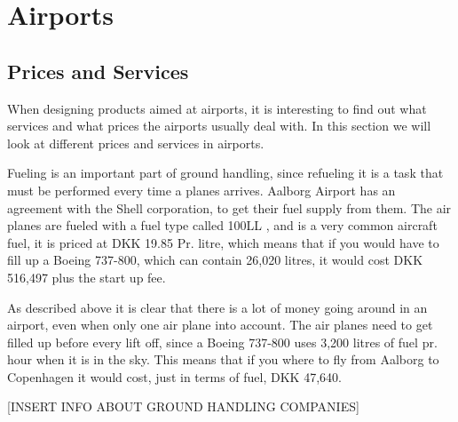 \chapter{Airports}
\section{Prices and Services}
When designing products aimed at airports, it is interesting to find out what services and what prices the airports usually deal with. In this section we will look at different prices and services in airports.


Fueling is an important part of ground handling, since refueling it is a task that must be performed every time a planes arrives. Aalborg Airport has an agreement with the Shell corporation, to get their fuel supply from them. The air planes are fueled with a fuel type called 100LL \cite{iaopa_fuelprices}, and is a very common aircraft fuel, it is priced at DKK 19.85 Pr. litre, which means that if you would have to fill up a Boeing 737-800, which can contain 26,020 litres\cite{737_specs}, it would cost DKK 516,497 plus the start up fee.

As described above it is clear that there is a lot of money going around in an airport, even when only one air plane into account. The air planes need to get filled up before every lift off, since a Boeing 737-800 uses 3,200 litres of fuel pr. hour when it is in the sky. This means that if you where to fly from Aalborg to Copenhagen it would cost, just in terms of fuel, DKK 47,640.

[INSERT INFO ABOUT GROUND HANDLING COMPANIES]


%
